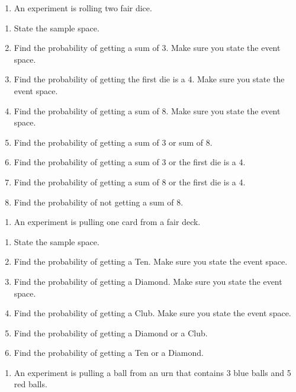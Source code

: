 \documentclass[
]{book}
\providecommand{\tightlist}{%
  \setlength{\itemsep}{0pt}\setlength{\parskip}{0pt}}
\begin{document}
\begin{enumerate}
\def\labelenumi{\arabic{enumi}.}
\setcounter{enumi}{4}
\tightlist
\item
  An experiment is rolling two fair dice.
\end{enumerate}

\begin{enumerate}
\def\labelenumi{\alph{enumi}.}
\tightlist
\item
  State the sample space.
\item
  Find the probability of getting a sum of 3. Make sure you state the event space.
\item
  Find the probability of getting the first die is a 4. Make sure you state the event space.
\item
  Find the probability of getting a sum of 8. Make sure you state the event space.
\item
  Find the probability of getting a sum of 3 or sum of 8.
\item
  Find the probability of getting a sum of 3 or the first die is a 4.
\item
  Find the probability of getting a sum of 8 or the first die is a 4.
\item
  Find the probability of not getting a sum of 8.
\end{enumerate}

\begin{enumerate}
\def\labelenumi{\arabic{enumi}.}
\setcounter{enumi}{5}
\tightlist
\item
  An experiment is pulling one card from a fair deck.
\end{enumerate}

\begin{enumerate}
\def\labelenumi{\alph{enumi}.}
\tightlist
\item
  State the sample space.
\item
  Find the probability of getting a Ten. Make sure you state the event space.
\item
  Find the probability of getting a Diamond. Make sure you state the event space.
\item
  Find the probability of getting a Club. Make sure you state the event space.
\item
  Find the probability of getting a Diamond or a Club.
\item
  Find the probability of getting a Ten or a Diamond.
\end{enumerate}

\begin{enumerate}
\def\labelenumi{\arabic{enumi}.}
\setcounter{enumi}{6}
\tightlist
\item
  An experiment is pulling a ball from an urn that contains 3 blue balls and 5 red balls.
\end{enumerate}
\end{document}
